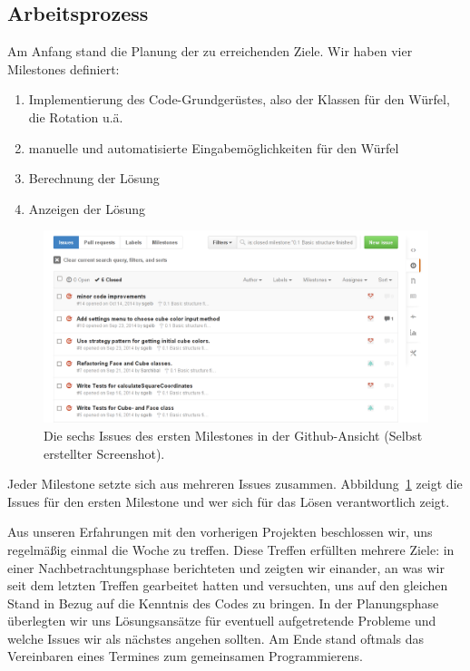\subsection{Arbeitsprozess}  %

Am Anfang stand die Planung der zu erreichenden Ziele. Wir haben vier Milestones definiert:

\begin{enumerate}
  \item Implementierung des Code-Grundgerüstes, also der Klassen für den Würfel,
    die Rotation u.ä.
  \item manuelle und automatisierte Eingabemöglichkeiten für den Würfel
  \item Berechnung der Lösung
  \item Anzeigen der Lösung
\end{enumerate}

\begin{figure}[ht!]
  \centering
  \includegraphics[width=\textwidth]{pics/github_issues.png}
  \caption{Die sechs Issues des ersten Milestones in der Github-Ansicht
  (Selbst erstellter Screenshot).}
  \label{fig:github_issues}
\end{figure}

Jeder Milestone setzte sich aus mehreren Issues zusammen.
Abbildung~\ref{fig:github_issues} zeigt die Issues für den ersten Milestone und
wer sich für das Lösen verantwortlich zeigt.

Aus unseren Erfahrungen mit den vorherigen Projekten beschlossen wir, uns
regelmäßig einmal die Woche zu treffen. Diese Treffen erfüllten mehrere Ziele:
in einer Nachbetrachtungsphase berichteten und zeigten wir einander, an was wir
seit dem letzten Treffen gearbeitet hatten und versuchten, uns auf den gleichen
Stand in Bezug auf die Kenntnis des Codes zu bringen. In der Planungsphase
überlegten wir uns Lösungsansätze für eventuell aufgetretende Probleme und
welche Issues wir als nächstes angehen sollten. Am Ende stand oftmals das
Vereinbaren eines Termines zum gemeinsamen Programmierens.


